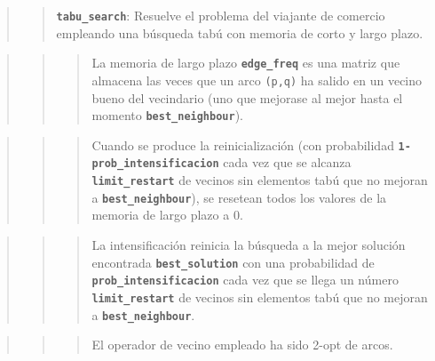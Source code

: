 \documentclass{article}
\begin{document}
\begin{quote}
\begin{quote}
\textbf{\texttt{tabu\_search}}:  Resuelve el problema del
viajante de comercio empleando una búsqueda tabú con memoria de corto y
largo plazo.
\end{quote}
\end{quote}

\begin{quote}
\begin{quote}
\begin{quote}
La memoria de largo plazo \textbf{\texttt{edge\_freq}} es una matriz que
almacena las veces que un arco \texttt{(p,q)} ha salido en un vecino
bueno del vecindario (uno que mejorase al mejor hasta el momento
\textbf{\texttt{best\_neighbour}}).
\end{quote}
\end{quote}
\end{quote}

\begin{quote}
\begin{quote}
\begin{quote}
Cuando se produce la reinicialización (con probabilidad
\textbf{\texttt{1-prob\_intensificacion}} cada vez que se alcanza
\textbf{\texttt{limit\_restart}} de vecinos sin elementos tabú que no
mejoran a \textbf{\texttt{best\_neighbour}}), se resetean todos los
valores de la memoria de largo plazo a 0.
\end{quote}
\end{quote}
\end{quote}

\begin{quote}
\begin{quote}
\begin{quote}
La intensificación reinicia la búsqueda a la mejor solución encontrada
\textbf{\texttt{best\_solution}} con una probabilidad de
\textbf{\texttt{prob\_intensificacion}} cada vez que se llega un número
\textbf{\texttt{limit\_restart}} de vecinos sin elementos tabú que no
mejoran a \textbf{\texttt{best\_neighbour}}.
\end{quote}
\end{quote}
\end{quote}

\begin{quote}
\begin{quote}
\begin{quote}
El operador de vecino empleado ha sido 2-opt de arcos.
\end{quote}
\end{quote}
\end{quote}
\end{document}

